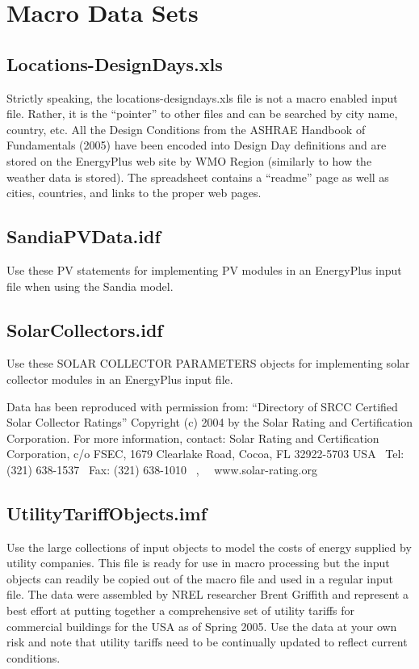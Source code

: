\section{Macro Data Sets}\label{macro-data-sets}

\subsection{Locations-DesignDays.xls}\label{locations-designdays.xls}

Strictly speaking, the locations-designdays.xls file is not a macro enabled input file. Rather, it is the ``pointer'' to other files and can be searched by city name, country, etc. All the Design Conditions from the ASHRAE Handbook of Fundamentals (2005) have been encoded into Design Day definitions and are stored on the EnergyPlus web site by WMO Region (similarly to how the weather data is stored). The spreadsheet contains a ``readme'' page as well as cities, countries, and links to the proper web pages.

\subsection{SandiaPVData.idf}\label{sandiapvdata.idf}

Use these PV statements for implementing PV modules in an EnergyPlus input file when using the Sandia model.

\subsection{SolarCollectors.idf}\label{solarcollectors.idf}

Use these SOLAR COLLECTOR PARAMETERS objects for implementing solar collector modules in an EnergyPlus input file.

Data has been reproduced with permission from: ``Directory of SRCC Certified Solar Collector Ratings'' Copyright (c) 2004 by the Solar Rating and Certification Corporation. For more information, contact: Solar Rating and Certification Corporation, c/o FSEC, 1679 Clearlake Road, Cocoa, FL 32922-5703 USA~ Tel: (321) 638-1537~ Fax: (321) 638-1010~ ,~~ www.solar-rating.org

\subsection{UtilityTariffObjects.imf}\label{utilitytariffobjects.imf}

Use the large collections of input objects to model the costs of energy supplied by utility companies. This file is ready for use in macro processing but the input objects can readily be copied out of the macro file and used in a regular input file. The data were assembled by NREL researcher Brent Griffith and represent a best effort at putting together a comprehensive set of utility tariffs for commercial buildings for the USA as of Spring 2005. Use the data at your own risk and note that utility tariffs need to be continually updated to reflect current conditions.
